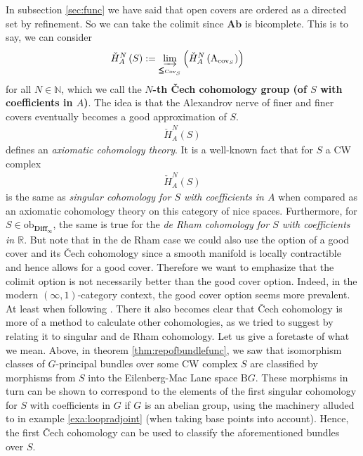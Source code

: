 In subsection \ref{sec:func} we have said that open covers are ordered as a directed set by refinement.
So we can take the colimit since $\mathbf{Ab}$ is bicomplete.
This is to say, we can consider
\begin{align*}
  \check{H}_{A}^{N}
  \left(
    S
  \right)
  &:=
  \varinjlim_{\pmb{\leq}_{\mathrm{Cov}_{S}}}
  \left(
    \check{H}_{A}^{N}
    \left(
      \mathrm{A}_{\mathrm{cov}_{S}}
    \right)
  \right)
\end{align*}
for all $N \in \mathbb{N}$, which we call the \textbf{$N$-th \v{C}ech cohomology group (of $S$ with coefficients in $A$)}.
The idea is that the Alexandrov nerve of finer and finer covers eventually becomes a good approximation of $S$.
\begin{align*}
  \check{H}_{A}^{N}
  \left(
    S
  \right)
\end{align*}
defines an \textit{axiomatic cohomology theory}.
It is a well-known fact that for $S$ a CW complex
\begin{align*}
  \check{H}_{A}^{N}
  \left(
    S
  \right)
\end{align*}
is the same as \textit{singular cohomology for $S$ with coefficients in $A$} when compared as an axiomatic cohomology theory on this category of nice spaces.
Furthermore, for $S \in \mathrm{ob}_{\mathbf{Diff}_{\infty}}$, the same is true for the \textit{de Rham cohomology for $S$ with coefficients in $\mathbb{R}$}.
But note that in the de Rham case we could also use the option of a good cover and its \v{C}ech cohomology since a smooth manifold is locally contractible and hence allows for a good cover.
Therefore we want to emphasize that the colimit option is not necessarily better than the good cover option.
Indeed, in the modern $(\infty,1)$-category context, the good cover option seems more prevalent.
At least when following \cite{a565d200}.
There it also becomes clear that \v{C}ech cohomology is more of a method to calculate other cohomologies, as we tried to suggest by relating it to singular and de Rham cohomology.
Let us give a foretaste of what we mean.
Above, in theorem \ref{thm:repofbundlefunc}, we saw that isomorphism classes of $G$-principal bundles over some CW complex $S$ are classified by morphisms from $S$ into the Eilenberg-Mac Lane space $\mathrm{B}G$.
These morphisms in turn can be shown to correspond to the elements of the first singular cohomology for $S$ with coefficients in $G$ if $G$ is an abelian group, using the machinery alluded to in example \ref{exa:loopradjoint} (when taking base points into account).
Hence, the first \v{C}ech cohomology can be used to classify the aforementioned bundles over $S$.
